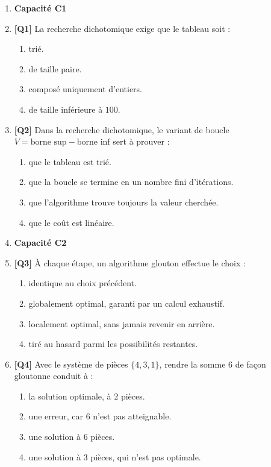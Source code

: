 \begin{enumerate}

\item[] \textbf{Capacité C1}

\item \textbf{[Q1]} La recherche dichotomique exige que le tableau soit :
  \begin{enumerate}[label=\Alph*.]
    \item trié.
    \item de taille paire.
    \item composé uniquement d'entiers.
    \item de taille inférieure à $100$.
  \end{enumerate}

\item \textbf{[Q2]} Dans la recherche dichotomique, le variant de boucle $V = \text{borne sup} - \text{borne inf}$ sert à prouver :
  \begin{enumerate}[label=\Alph*.]
    \item que le tableau est trié.
    \item que la boucle se termine en un nombre fini d'itérations.
    \item que l'algorithme trouve toujours la valeur cherchée.
    \item que le coût est linéaire.
  \end{enumerate}

\item[] \textbf{Capacité C2}

\item \textbf{[Q3]} À chaque étape, un algorithme glouton effectue le choix :
  \begin{enumerate}[label=\Alph*.]
    \item identique au choix précédent.
    \item globalement optimal, garanti par un calcul exhaustif.
    \item localement optimal, sans jamais revenir en arrière.
    \item tiré au hasard parmi les possibilités restantes.
  \end{enumerate}

\item \textbf{[Q4]} Avec le système de pièces $\{4, 3, 1\}$, rendre la somme $6$ de façon gloutonne conduit à :
  \begin{enumerate}[label=\Alph*.]
    \item la solution optimale, à $2$ pièces.
    \item une erreur, car $6$ n'est pas atteignable.
    \item une solution à $6$ pièces.
    \item une solution à $3$ pièces, qui n'est pas optimale.
  \end{enumerate}


\end{enumerate}
